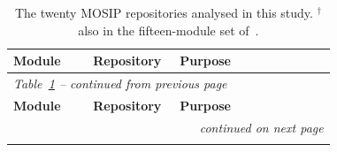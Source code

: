 \begin{longtable}{@{}p{0.235\linewidth}p{0.255\linewidth}p{0.45\linewidth}@{}}
\caption{The twenty MOSIP repositories analysed in this study.
$^{\dagger}$ also in the fifteen-module set of~\cite{agarwal2025mosip}.}
\label{tab:modules} \\
\toprule
\textbf{Module} & \textbf{Repository} & \textbf{Purpose} \\
\midrule
\endfirsthead
\multicolumn{3}{l}{\small\textit{Table~\ref{tab:modules} -- continued from previous page}} \\
\toprule
\textbf{Module} & \textbf{Repository} & \textbf{Purpose} \\
\midrule
\endhead
\midrule
\multicolumn{3}{r}{\small\textit{continued on next page}} \\
\endfoot
\bottomrule
\endlastfoot


\end{longtable}

